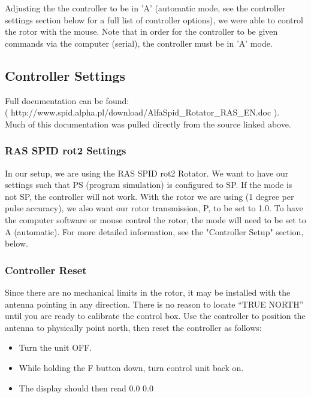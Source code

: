 \documentclass[11pt]{article} %
\begin{document}
\vspace{3.5cm}
Adjusting the the controller to be in 'A' (automatic mode, see the controller settings section below for a full list of controller options), we were able to control the rotor with the mouse. Note that in order for the controller to be given commands via the computer (serial), the controller must be in 'A' mode.



\subsection{Controller Settings}

Full documentation can be found: \\ ( http://www.spid.alpha.pl/download/AlfaSpid\_Rotator\_RAS\_EN.doc ).\\ Much of this documentation was pulled directly from the source linked above.

\subsubsection{RAS SPID rot2 Settings}

In our setup, we are using the RAS SPID rot2 Rotator. We want to have our settings such that PS (program simulation) is configured to SP. If the mode is not SP, the controller will not work. With the rotor we are using (1 degree per pulse accuracy), we also want our rotor transmission, P, to be set to 1.0. To have the computer software or mouse control the rotor, the mode will need to be set to A (automatic). For more detailed information, see the "Controller Setup" section, below.

\subsubsection{Controller Reset}

Since there are no mechanical limits in the rotor, it may be installed with the antenna pointing in any direction. There is no reason to locate “TRUE NORTH” until you are ready to calibrate the control box. Use the controller to position the antenna to physically point north, then reset the controller as follows:
\begin{itemize}
\item Turn the unit OFF.
\item While holding the F button down, turn control unit back on.
\item The display should then read 0.0 0.0
\end{itemize}
\end{document}
